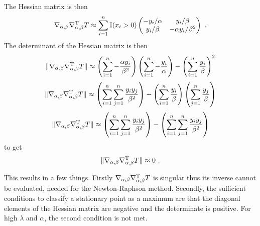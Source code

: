 \documentclass[12pt, a4paper]{memoir}
\newcommand{\T}{^\textup{T}}
\begin{document}
The Hessian matrix is then
\begin{equation}
\nabla_{\alpha,\beta}\nabla_{\alpha,\beta}\T T \approx
\sum_{i=1}^n
\mathbb{I}(x_i>0)
\begin{pmatrix}
-y_i/\alpha  & y_i/\beta \\
y_i/\beta & -\alpha y_i/\beta^2
\end{pmatrix}  \ . 
\end{equation}
The determinant of the Hessian matrix is then
\begin{equation*}
\|\nabla_{\alpha,\beta}\nabla_{\alpha,\beta}\T T\|
\approx
\left(\sum_{i=1}^n-\frac{\alpha y_i}{\beta^2}\right)
\left(\sum_{i=1}^n-\frac{y_i}{\alpha}\right) - \left(\sum_{i=1}^n\frac{y_i}{\beta}\right)^2
\end{equation*}
\begin{equation*}
\|\nabla_{\alpha,\beta}\nabla_{\alpha,\beta}\T T\|
\approx
\left(\sum_{i=1}^n\sum_{j=1}^n\frac{y_iy_j}{\beta^2}\right)
 - \left(\sum_{i=1}^n\frac{y_i}{\beta}\right)\left(\sum_{j=1}^n\frac{y_j}{\beta}\right)
\end{equation*}
\begin{equation*}
\|\nabla_{\alpha,\beta}\nabla_{\alpha,\beta}\T T\|
\approx
\left(\sum_{i=1}^n\sum_{j=1}^n\frac{y_iy_j}{\beta^2}\right)
 - \left(\sum_{i=1}^n\sum_{j=1}^n\frac{y_iy_j}{\beta^2}\right)
\end{equation*}
to get
\begin{equation}
\|\nabla_{\alpha,\beta}\nabla_{\alpha,\beta}\T T\|
\approx
0 \ .
\end{equation}

This results in a few things. Firstly $\nabla_{\alpha,\beta}\nabla_{\alpha,\beta}\T T$ is singular thus its inverse cannot be evaluated, needed for the Newton-Raphson method. Secondly, the sufficient conditions to classify a stationary point as a maximum are that the diagonal elements of the Hessian matrix are negative and the determinate is positive. For high $\lambda$ and $\alpha$, the second condition is not met.
\end{document}
